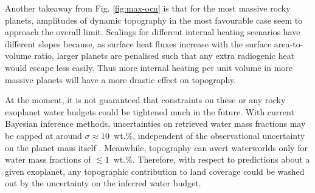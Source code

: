 Another takeaway from Fig. \ref{fig:max-ocn} is that for the most massive rocky planets, amplitudes of dynamic topography in the most favourable case seem to approach the overall limit. Scalings for different internal heating scenarios have different slopes because, as surface heat fluxes increase with the surface area-to-volume ratio, larger planets are penalised such that any extra radiogenic heat would escape less easily. Thus more internal heating per unit volume in more massive planets will have a more drastic effect on topography. 


At the moment, it is not guaranteed that constraints on these or any rocky exoplanet water budgets could be tightened much in the future. With current Bayesian inference methods, uncertainties on retrieved water mass fractions may be capped at around $\sigma \approx 10$~wt.\%, independent of the observational uncertainty on the planet mass itself \citep{otegi_impact_2020}. Meanwhile, topography can avert waterworlds only for water mass fractions of $\lesssim 1$~wt.\%. Therefore, with respect to predictions about a given exoplanet, any topographic contribution to land coverage could be washed out by the uncertainty on the inferred water budget.



 
 
